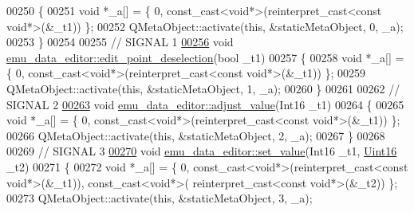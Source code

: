 \begin{DoxyCode}
00250 \{
00251     \textcolor{keywordtype}{void} *\_a[] = \{ 0, \textcolor{keyword}{const\_cast<}\textcolor{keywordtype}{void}*\textcolor{keyword}{>}(\textcolor{keyword}{reinterpret\_cast<}\textcolor{keyword}{const }\textcolor{keywordtype}{void}*\textcolor{keyword}{>}(&\_t1)) \};
00252     QMetaObject::activate(\textcolor{keyword}{this}, &staticMetaObject, 0, \_a);
00253 \}
00254 
00255 \textcolor{comment}{// SIGNAL 1}
\hypertarget{a00065_source_l00256}{}\hyperlink{a00008_a2b9629d20c2b97c01bf8486c89fd0148}{00256} \textcolor{keywordtype}{void} \hyperlink{a00008_a2b9629d20c2b97c01bf8486c89fd0148}{emu\_data\_editor::edit\_point\_deselection}(\textcolor{keywordtype}{bool} \_t1)
00257 \{
00258     \textcolor{keywordtype}{void} *\_a[] = \{ 0, \textcolor{keyword}{const\_cast<}\textcolor{keywordtype}{void}*\textcolor{keyword}{>}(\textcolor{keyword}{reinterpret\_cast<}\textcolor{keyword}{const }\textcolor{keywordtype}{void}*\textcolor{keyword}{>}(&\_t1)) \};
00259     QMetaObject::activate(\textcolor{keyword}{this}, &staticMetaObject, 1, \_a);
00260 \}
00261 
00262 \textcolor{comment}{// SIGNAL 2}
\hypertarget{a00065_source_l00263}{}\hyperlink{a00008_a74d292de22b341313df1852cb1033704}{00263} \textcolor{keywordtype}{void} \hyperlink{a00008_a74d292de22b341313df1852cb1033704}{emu\_data\_editor::adjust\_value}(Int16 \_t1)
00264 \{
00265     \textcolor{keywordtype}{void} *\_a[] = \{ 0, \textcolor{keyword}{const\_cast<}\textcolor{keywordtype}{void}*\textcolor{keyword}{>}(\textcolor{keyword}{reinterpret\_cast<}\textcolor{keyword}{const }\textcolor{keywordtype}{void}*\textcolor{keyword}{>}(&\_t1)) \};
00266     QMetaObject::activate(\textcolor{keyword}{this}, &staticMetaObject, 2, \_a);
00267 \}
00268 
00269 \textcolor{comment}{// SIGNAL 3}
\hypertarget{a00065_source_l00270}{}\hyperlink{a00008_a9d26460f253a29dd961b20be0afb5358}{00270} \textcolor{keywordtype}{void} \hyperlink{a00008_a9d26460f253a29dd961b20be0afb5358}{emu\_data\_editor::set\_value}(Int16 \_t1, \hyperlink{a00004_aae7407b021d43f7193a81a58cfb3e297}{Uint16} \_t2)
00271 \{
00272     \textcolor{keywordtype}{void} *\_a[] = \{ 0, \textcolor{keyword}{const\_cast<}\textcolor{keywordtype}{void}*\textcolor{keyword}{>}(\textcolor{keyword}{reinterpret\_cast<}\textcolor{keyword}{const }\textcolor{keywordtype}{void}*\textcolor{keyword}{>}(&\_t1)), \textcolor{keyword}{const\_cast<}\textcolor{keywordtype}{void}*\textcolor{keyword}{>}(\textcolor{keyword}{
      reinterpret\_cast<}\textcolor{keyword}{const }\textcolor{keywordtype}{void}*\textcolor{keyword}{>}(&\_t2)) \};
00273     QMetaObject::activate(\textcolor{keyword}{this}, &staticMetaObject, 3, \_a);

\end{DoxyCode}
